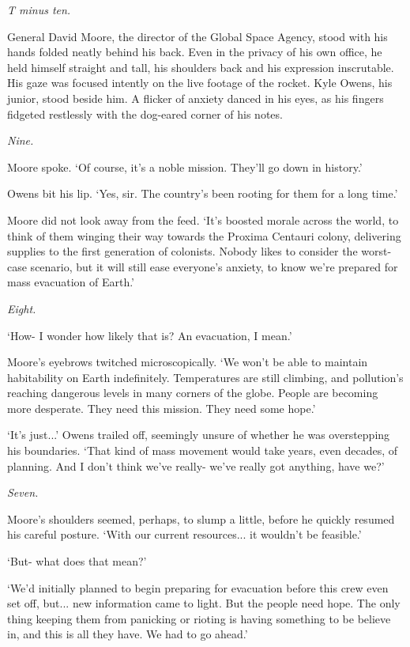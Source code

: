 {\it T minus ten.}

General David Moore, the director of the Global Space Agency, stood with his hands folded neatly behind his back. Even in the privacy of his own office, he held himself straight and tall, his shoulders back and his expression inscrutable. His gaze was focused intently on the live footage of the rocket. Kyle Owens, his junior, stood beside him. A flicker of anxiety danced in his eyes, as his fingers fidgeted restlessly with the dog-eared corner of his notes.

{\it Nine.}

Moore spoke. `Of course, it's a noble mission. They'll go down in history.'

Owens bit his lip. `Yes, sir. The country's been rooting for them for a long time.'

Moore did not look away from the feed. `It's boosted morale across the world, to think of them winging their way towards the Proxima Centauri colony, delivering supplies to the first generation of colonists. Nobody likes to consider the worst-case scenario, but it will still ease everyone's anxiety, to know we're prepared for mass evacuation of Earth.'

{\it Eight.}

`How- I wonder how likely that is? An evacuation, I mean.'

Moore's eyebrows twitched microscopically. `We won't be able to maintain habitability on Earth indefinitely. Temperatures are still climbing, and pollution's reaching dangerous levels in many corners of the globe. People are becoming more desperate. They need this mission. They need some hope.'

`It's just...' Owens trailed off, seemingly unsure of whether he was overstepping his boundaries. `That kind of mass movement would take years, even decades, of planning. And I don't think we've really- we've really got anything, have we?'

{\it Seven.}

Moore's shoulders seemed, perhaps, to slump a little, before he quickly resumed his careful posture. `With our current resources... it wouldn't be feasible.'

`But- what does that mean?'

`We'd initially planned to begin preparing for evacuation before this crew even set off, but... new information came to light. But the people need hope. The only thing keeping them from panicking or rioting is having something to be believe in, and this is all they have. We had to go ahead.'

